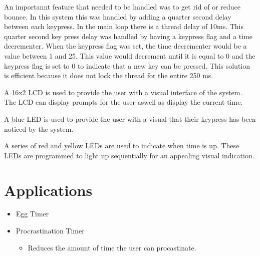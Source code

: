 \documentclass{article}
\begin{document}
\noindent
An importannt feature that needed to be handled was to get rid of or reduce bounce.  In 
this system this was handled by adding a quarter second delay between each keypress.  In 
the main loop there is a thread delay of 10ms.  This quarter second key press delay was
handled by having a keypress flag and a time decrementer.  When the keypress flag was
set, the time decrementer would be a value between 1 and 25.  This value would decrement
until it is equal to 0 and the keypress flag is set to 0 to indicate that a new key can 
be pressed.  This solution is efficient because it does not lock the thread for the 
entire 250 ms.
\newline

\noindent
A 16x2 LCD is used to provide the user with a visual interface of the system.  The LCD can display prompts
for the user aswell as display the current time.
\newline

\noindent
A blue LED is used to provide the user with a visual that their keypress has been noticed by the system.
\newline

\noindent
A series of red and yellow LEDs are used to indicate when time is up.  These LEDs are programmed to light
up sequentially for an appealing visual indication.
\newline

\section{Applications}
\begin{itemize}
    \item Egg Timer
    \item Procrastination Timer
    \begin{itemize}
        \item Reduces the amount of time the user can procastinate.
      \end{itemize}
    
  \end{itemize}
\end{document}
